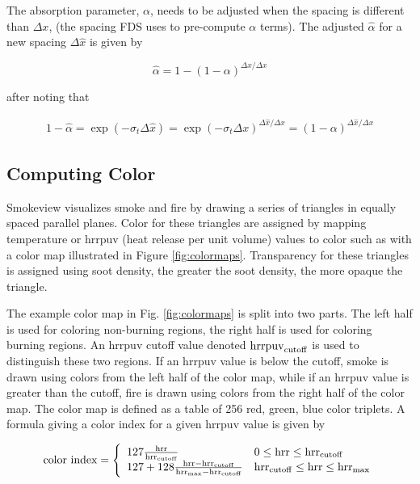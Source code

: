 {The absorption parameter, $\alpha$, needs to be adjusted when the spacing is different than $\Delta x$,
(the spacing FDS uses to pre-compute $\alpha$ terms).
The adjusted $\hat{\alpha}$ for a new spacing $\Delta\hat{x}$ is given by

\begin{equation}
\label{eq:alphahat}
\hat{\alpha}=1-(1-\alpha)^{\Delta\hat{x}/\Delta x}
\end{equation}

after noting that

\begin{eqnarray}
1-\hat{\alpha}=\exp(-\sigma_t\Delta\hat{x})=\exp(-\sigma_t\Delta
x)^{\Delta\hat{x}/\Delta x}=(1-\alpha)^{\Delta\hat{x}/\Delta x}
\end{eqnarray}


\subsection{Computing Color}

Smokeview visualizes smoke and fire by drawing a series of triangles in equally spaced parallel planes.
Color for these triangles are assigned by mapping temperature or hrrpuv (heat release per unit volume) values
to color such as with a color map illustrated in Figure \ref{fig:colormaps}.
Transparency for these triangles is assigned using soot density, the greater the soot density, the more opaque the triangle.

The example color map in Fig.
\ref{fig:colormaps} is split into two parts.  The left half is used
for coloring non-burning regions, the right half is used for coloring burning regions.
An hrrpuv cutoff value denoted ${\rm hrrpuv}_{\rm cutoff}$ is used to
distinguish these two regions.
If an hrrpuv value is below the cutoff,
smoke is drawn using colors from the left half of the color map, while if an hrrpuv value is greater than the cutoff,
fire is drawn using colors from the right half of the color map.  The color map is defined as a table
of 256 red, green, blue color triplets.  A formula giving a color index for a given hrrpuv value is given by

\newcommand{\hrr}{{\rm hrr}}
\newcommand{\hrrcutoff}{{\rm hrr}_{\rm cutoff}}
\newcommand{\hrrmax}{{\rm hrr}_{\rm max}}

\begin{eqnarray}
\mbox{color index}=\left\{
\begin{array}{ll}
  127\frac{\hrr}{\hrrcutoff} & 0 \le \hrr \le \hrrcutoff \\
  127 + 128\frac{\hrr-\hrrcutoff}{\hrrmax-\hrrcutoff} & \hrrcutoff \le \hrr \le \hrrmax
\end{array}
\right.
\end{eqnarray}

}
